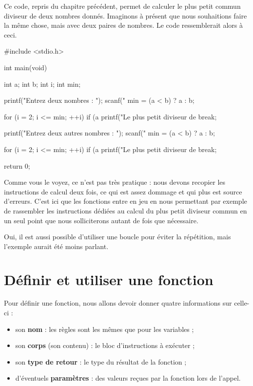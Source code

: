 Ce code, repris du chapitre précédent, permet de calculer le plus petit
commun diviseur de deux nombres donnés. Imaginons à présent que nous
souhaitions faire la même chose, mais avec deux paires de nombres. Le
code ressemblerait alors à ceci.

\begin{C}
#include <stdio.h>


int main(void)
{
    int a;
    int b;
    int i;
    int min;

    printf("Entrez deux nombres : ");
    scanf("%
    min = (a < b) ? a : b;

    for (i = 2; i <= min; ++i)
    {
        if (a %
        {
            printf("Le plus petit diviseur de %
            break;
        }
    }

    printf("Entrez deux autres nombres : ");
    scanf("%
    min = (a < b) ? a : b;

    for (i = 2; i <= min; ++i)
    {
        if (a %
        {
            printf("Le plus petit diviseur de %
            break;
        }
    }

    return 0;
}
\end{C}

Comme vous le voyez, ce n'est pas très pratique : nous devons recopier
les instructions de calcul deux fois, ce qui est assez dommage et qui
plus est source d'erreurs. C'est ici que les fonctions entre en jeu en
nous permettant par exemple de rassembler les instructions dédiées au
calcul du plus petit diviseur commun en un seul point que nous
solliciterons autant de fois que nécessaire.

\begin{infobox}
  Oui, il est aussi possible d'utiliser
une boucle pour éviter la répétition, mais l'exemple aurait été moins
parlant.
\end{infobox}

\section{Définir et utiliser une fonction}
\label{definir-et-utiliser-une-fonction}

Pour définir une fonction, nous allons devoir donner quatre informations
sur celle-ci :

\begin{itemize}
\item
  son \textbf{nom} : les règles sont les mêmes que pour les variables ;
\item
  son \textbf{corps} (son contenu) : le bloc d'instructions à exécuter ;
\item
  son \textbf{type de retour} : le type du résultat de la fonction ;
\item
  d'éventuels \textbf{paramètres} : des valeurs reçues par la fonction
  lors de l'appel.
\end{itemize}

